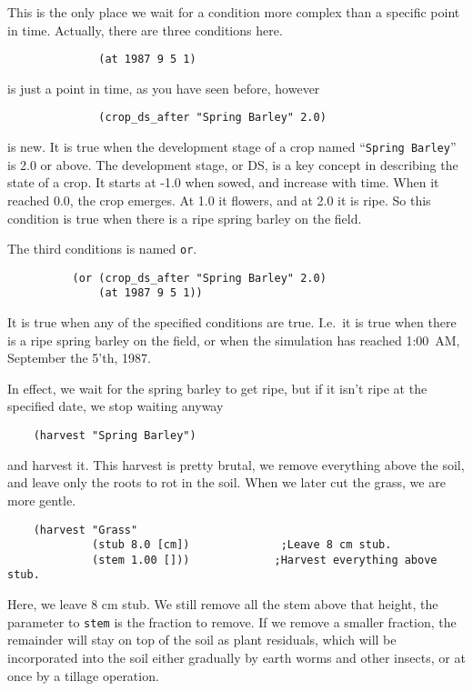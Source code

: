 \documentclass[a4paper]{article}
\begin{document}
This is the only place we wait for a condition more complex than a
specific point in time.  Actually, there are three conditions here.

\begin{verbatim}
              (at 1987 9 5 1)
\end{verbatim}

is just a point in time, as you have seen before, however

\begin{verbatim}
              (crop_ds_after "Spring Barley" 2.0)
\end{verbatim}

is new.  It is true when the development stage of a crop named
``\texttt{Spring Barley}'' is 2.0 or above.  The development stage, or
DS, is a key concept in describing the state of a crop.  It starts at
-1.0 when sowed, and increase with time.  When it reached 0.0, the
crop emerges.  At 1.0 it flowers, and at 2.0 it is ripe.   So this
condition is true when there is a ripe spring barley on the field.

The third conditions is named \texttt{or}.

\begin{verbatim}
          (or (crop_ds_after "Spring Barley" 2.0)
              (at 1987 9 5 1))
\end{verbatim}

It is true when any of the specified conditions are true.  I.e.\ it is
true when there is a ripe spring barley on the field, or when the
simulation has reached 1:00~AM, September the 5'th, 1987.

In effect, we wait for the spring barley to get ripe, but if it isn't
ripe at the specified date, we stop waiting anyway

\begin{verbatim}
    (harvest "Spring Barley")
\end{verbatim}

and harvest it.  This harvest is pretty brutal, we remove everything
above the soil, and leave only the roots to rot in the soil.  When we
later cut the grass, we are more gentle.

\begin{verbatim}
    (harvest "Grass"
             (stub 8.0 [cm])              ;Leave 8 cm stub.
             (stem 1.00 []))             ;Harvest everything above stub.
\end{verbatim}

Here, we leave 8 cm stub.  We still remove all the stem above that
height, the parameter to \texttt{stem} is the fraction to remove.  If
we remove a smaller fraction, the remainder will stay on top of the
soil as plant residuals, which will be incorporated into the soil
either gradually by earth worms and other insects, or at once by a
tillage operation.
\end{document}
